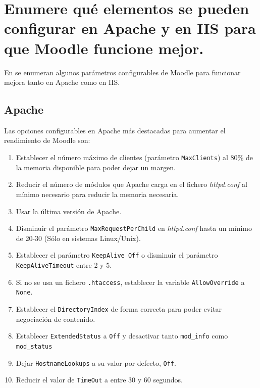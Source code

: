 \documentclass[10pt,a4paper,spanish]{article}
\numberwithin{equation}{section} %
\numberwithin{figure}{section} %
\numberwithin{table}{section} %
\begin{document}
\section{Enumere qué elementos se pueden configurar en Apache y en IIS para que Moodle funcione mejor.}
En \cite{moodle} se enumeran algunos parámetros configurables de Moodle para funcionar mejora tanto en Apache como en IIS.

\subsection{Apache}
Las opciones configurables en Apache más destacadas para aumentar el rendimiento de Moodle son:

\begin{enumerate}[$\bullet$]
    \item Establecer el número máximo de clientes (parámetro \texttt{MaxClients}) al 80\% de la memoria disponible para poder dejar un margen.
    \item Reducir el número de módulos que Apache carga en el fichero \textit{httpd.conf} al mínimo necesario para reducir la memoria necesaria.
    \item Usar la última versión de Apache.
    \item Disminuir el parámetro \texttt{MaxRequestPerChild} en \textit{httpd.conf} hasta un mínimo de 20-30 (Sólo en sistemas Linux/Unix).
    \item Establecer el parámetro \texttt{KeepAlive Off} o disminuir el parámetro \texttt{KeepAliveTimeout} entre 2 y 5.
    \item Si no se usa un fichero \texttt{.htaccess}, establecer la variable \texttt{AllowOverride} a \texttt{None}.
    \item Establecer el \texttt{DirectoryIndex} de forma correcta para poder evitar negociación de contenido.
    \item Establecer \texttt{ExtendedStatus} a \texttt{Off} y desactivar tanto \texttt{mod\_info} como \texttt{mod\_status}
    \item Dejar \texttt{HostnameLookups} a su valor por defecto, \texttt{Off}.
    \item Reducir el valor de \texttt{TimeOut} a entre 30 y 60 segundos.
\end{enumerate}
\end{document}
